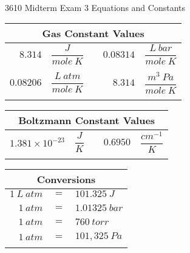 \documentclass[12pt, letterpaper]{memoir}
\begin{document}
\newpage
\pagestyle{empty}

~
\vspace{-3em}
\begin{center}
	{\LARGE 3610 Midterm Exam 3 Equations and Constants}	
\end{center}

\vspace{-1em}
\begin{minipage}{0.57\linewidth}
	\begin{mdframed}
		\begin{tabular}{rlcrl}
			\multicolumn{5}{c}{Gas Constant Values}\\ \midrule
			$8.314$ & $\dfrac{J}{mole~K}$ && $0.08314$ & $\dfrac{L~bar}{mole~K}$\\ \\
			$0.08206$ & $\dfrac{L~atm}{mole~K}$ && $8.314$ & $\dfrac{m^3~Pa}{mole~K}$\\ \\
		\end{tabular}
		\begin{tabular}{rlcrl}
			\multicolumn{5}{c}{Boltzmann Constant Values}\\ \midrule
			$1.381 \times 10^{-23}$ & $\dfrac{J}{K}$ && $0.6950$ & $\dfrac{cm^{-1}}{K}$\\ \\
		\end{tabular}
	\end{mdframed}
\end{minipage}
\hspace{20pt}
\begin{minipage}{0.4\linewidth}
	\begin{mdframed}
		\begin{tabular}{rcl}
			\multicolumn{3}{c}{Conversions}\\ \midrule
			$1~L~atm $ & $=$ & $101.325~J$\\ \\
			$1~atm $ & $=$ & $1.01325~bar$\\ \\
			$1~atm $ & $=$ & $760~torr$\\ \\
			$1~atm $ & $=$ & $101,325~Pa$ \\ \\
		\end{tabular}
	\end{mdframed}	
\end{minipage}
\end{document}

